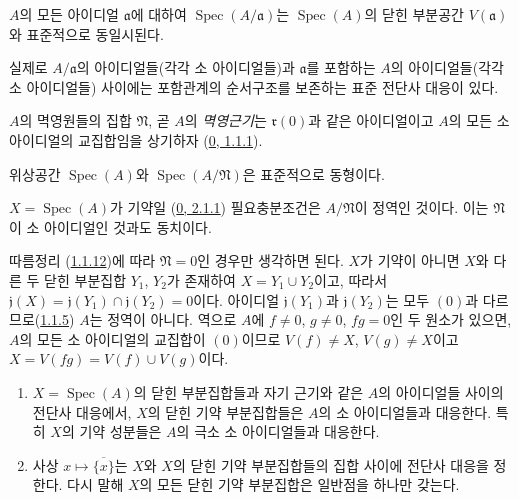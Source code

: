 \begin{proposition}[1.1.11]
\label{I.1.1.11-ko}
$A$의 모든 아이디얼 $\mathfrak{a}$에 대하여
$\operatorname{Spec}(A/\mathfrak{a})$는
$\operatorname{Spec}(A)$의 닫힌 부분공간 $V(\mathfrak{a})$와
표준적으로 동일시된다.
\end{proposition}

실제로 $A/\mathfrak{a}$의 아이디얼들(각각 소 아이디얼들)과
$\mathfrak{a}$를 포함하는 $A$의 아이디얼들(각각 소 아이디얼들)
사이에는 포함관계의 순서구조를 보존하는 표준 전단사 대응이 있다.

$A$의 멱영원들의 집합 $\mathfrak{N}$, 곧 $A$의
\emph{멱영근기}는 $\mathfrak{r}(0)$과 같은 아이디얼이고
$A$의 모든 소 아이디얼의 교집합임을 상기하자
(\hyperref[0.1.1.1-ko]{0, 1.1.1}).

\begin{corollary}[1.1.12]
\label{I.1.1.12-ko}
위상공간 $\operatorname{Spec}(A)$와
$\operatorname{Spec}(A/\mathfrak{N})$은 표준적으로 동형이다.
\end{corollary}

\begin{proposition}[1.1.13]
\label{I.1.1.13-ko}
$X=\operatorname{Spec}(A)$가 기약일
(\hyperref[0.2.1.1-ko]{0, 2.1.1}) 필요충분조건은
$A/\mathfrak{N}$이 정역인 것이다. 이는 $\mathfrak{N}$이
소 아이디얼인 것과도 동치이다.
\end{proposition}

따름정리 (\hyperref[I.1.1.12-ko]{1.1.12})에 따라
$\mathfrak{N}=0$인 경우만 생각하면 된다. $X$가 기약이 아니면
$X$와 다른 두 닫힌 부분집합 $Y_1$, $Y_2$가 존재하여
$X=Y_1\cup Y_2$이고, 따라서
$\mathfrak{j}(X)=\mathfrak{j}(Y_1)\cap\mathfrak{j}(Y_2)=0$이다.
아이디얼 $\mathfrak{j}(Y_1)$과 $\mathfrak{j}(Y_2)$는 모두
$(0)$과 다르므로(\hyperref[I.1.1.5-ko]{1.1.5}) $A$는 정역이
아니다. 역으로 $A$에 $f\neq0$, $g\neq0$, $fg=0$인 두 원소가
있으면, $A$의 모든 소 아이디얼의 교집합이 $(0)$이므로
$V(f)\neq X$, $V(g)\neq X$이고
$X=V(fg)=V(f)\cup V(g)$이다.

\begin{corollary}[1.1.14]
\label{I.1.1.14-ko}
\begin{enumerate}
  \item[\rm(i)] $X=\operatorname{Spec}(A)$의 닫힌 부분집합들과 자기
  근기와 같은 $A$의 아이디얼들 사이의 전단사 대응에서, $X$의 닫힌
  기약 부분집합들은 $A$의 소 아이디얼들과 대응한다. 특히 $X$의
  기약 성분들은 $A$의 극소 소 아이디얼들과 대응한다.
  \item[\rm(ii)] 사상 $x\mapsto\overline{\{x\}}$는 $X$와 $X$의
  닫힌 기약 부분집합들의 집합 사이에 전단사 대응을 정한다.
  다시 말해 $X$의 모든 닫힌 기약 부분집합은 일반점을 하나만 갖는다.
\end{enumerate}
\end{corollary}

